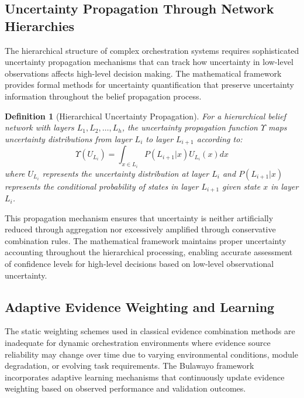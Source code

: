 \documentclass[12pt,a4paper]{article}
\newtheorem{definition}[theorem]{Definition}
\begin{document}
\subsection{Uncertainty Propagation Through Network Hierarchies}

The hierarchical structure of complex orchestration systems requires sophisticated uncertainty propagation mechanisms that can track how uncertainty in low-level observations affects high-level decision making. The mathematical framework provides formal methods for uncertainty quantification that preserve uncertainty information throughout the belief propagation process.

\begin{definition}[Hierarchical Uncertainty Propagation]
For a hierarchical belief network with layers $L_1, L_2, \ldots, L_h$, the uncertainty propagation function $\Upsilon$ maps uncertainty distributions from layer $L_i$ to layer $L_{i+1}$ according to:
\begin{equation}
\Upsilon(U_{L_i}) = \int_{x \in L_i} P(L_{i+1} | x) U_{L_i}(x) dx
\end{equation}
where $U_{L_i}$ represents the uncertainty distribution at layer $L_i$ and $P(L_{i+1} | x)$ represents the conditional probability of states in layer $L_{i+1}$ given state $x$ in layer $L_i$.
\end{definition}

This propagation mechanism ensures that uncertainty is neither artificially reduced through aggregation nor excessively amplified through conservative combination rules. The mathematical framework maintains proper uncertainty accounting throughout the hierarchical processing, enabling accurate assessment of confidence levels for high-level decisions based on low-level observational uncertainty.

\subsection{Adaptive Evidence Weighting and Learning}

The static weighting schemes used in classical evidence combination methods are inadequate for dynamic orchestration environments where evidence source reliability may change over time due to varying environmental conditions, module degradation, or evolving task requirements. The Bulawayo framework incorporates adaptive learning mechanisms that continuously update evidence weighting based on observed performance and validation outcomes.
\end{document}
